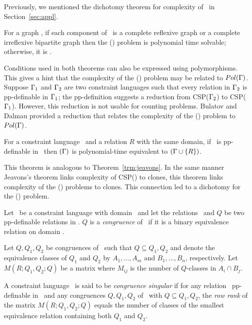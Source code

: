 Previously, we mentioned the dichotomy theorem for complexity of \ccsp\ in  Section~\ref{sec:appl}.

\begin{theorem} 
For a graph \mH, if each component of \mH\ is a complete reflexive graph
or a complete irreflexive bipartite graph then the \chom(\mH) problem 
is polynomial time solvable; otherwise, it is \cpc\@.
\end{theorem}

Conditions used in both theorems can also be expressed using polymorphisms. This gives a hint
that the complexity of the \ccsp(\mrelset) problem may be related to \(Pol(\Gamma)\)\@.
Suppose  \(\Gamma_1\) and \(\Gamma_2\) are two constraint languages such that
every relation in \(\Gamma_2\) is pp-definable in \(\Gamma_1\); 
the pp-definition suggests a reduction from CSP(\(\Gamma_2\))
to CSP(\(\Gamma_1\))\@. However, this reduction is not usable for counting problems. 
Bulatov and Dalmau provided a reduction that relates 
the complexity of the \ccsp(\mrelset) problem to \(Pol(\Gamma)\)\@.

\begin{theorem} 
For a constraint language \mrelset\ and a relation \(R\) with the same domain,
if \mR\ is pp-definable in \mrelset\ then \ccsp\((\Gamma)\) is polynomial-time equivalent 
to \ccsp\((\Gamma \cup \{{R}\})\)\@.
\end{theorem}

This theorem is analogous to Theorem~\ref{trm:jeavons}. In the same manner Jeavons's theorem
links complexity of CSP(\mrelset) to clones, this theorem
links complexity of the \ccsp(\mrelset) problems to clones. This connection
led to a dichotomy for the \ccsp(\mrelset) problem.

Let \mrelset\ be a constraint language with domain \mD\ and 
let the relations \mR\ and \(Q\) be two pp-definable relations in \mrelset\@.
\(Q\) is a \emph{congruence} of \mR\ if it is a binary
equivalence relation on domain \mR\@.

Let \(Q,Q_1,Q_2\) be congruences of \mR\ such that
\(Q\subseteq Q_1,Q_2\) and denote the equivalence classes of
\(Q_1\) and \(Q_2\) by \(A_1,\dotsc,A_m\) and \(B_1,\dotsc,B_n\), respectively. 
Let \(M(R;Q_1,Q_2;Q)\) be a matrix where \(M_{ij}\) is the number of \(Q\)-classes in
\(A_i\cap B_j\). 

A constraint language \mrelset\ is said to be \emph{congruence
 singular} if for any relation \mR\ pp-definable in \mrelset\ and any congruences
\(Q,Q_1,Q_2\) of \mR\ with \(Q\subseteq Q_1,Q_2\), the
\emph{row rank} of the matrix \(M(R;Q_1,Q_2;Q)\) equals
the number of classes of the smallest equivalence relation containing
both \(Q_1\) and \(Q_2\)\@. 

